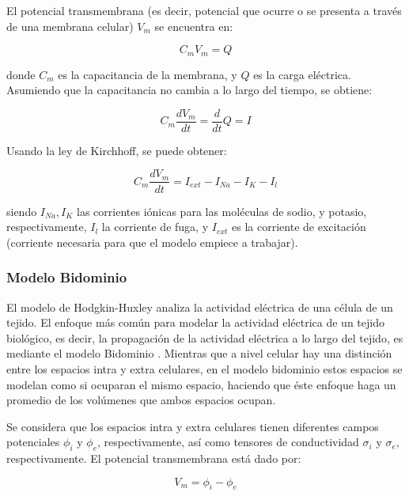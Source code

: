 El potencial transmembrana (es decir, potencial que ocurre o se presenta a través de una membrana celular) $V_m$ se encuentra en:

\begin{equation}
	C_m V_m = Q
\end{equation}

donde $C_m$ es la capacitancia de la membrana, y $Q$ es la carga eléctrica. Asumiendo que la capacitancia no cambia a lo largo del tiempo, se obtiene:

\begin{equation}
	C_m \frac{d V_m}{d t} = \frac{d}{dt} Q = I
\end{equation}

Usando la ley de Kirchhoff, se puede obtener:

\begin{equation}
	C_m \frac{d V_m}{d t} = I_{ext} - I_{Na} - I_K - I_l
\end{equation}

siendo $I_{Na}, I_K$ las corrientes iónicas para las moléculas de sodio, y potasio, respectivamente, $I_l$ la corriente de fuga, y $I_{ext}$ es la corriente de excitación (corriente necesaria para que el modelo empiece a trabajar). 

\subsubsection{Modelo Bidominio}

El modelo de Hodgkin-Huxley analiza la actividad eléctrica de una célula de un tejido. El enfoque más común para modelar la actividad eléctrica de un tejido biológico, es decir, la propagación de la actividad eléctrica a lo largo del tejido, es mediante el modelo Bidominio \citep{physiology2009keener, rohrle2010simulating, matthias20113d}. Mientras que a nivel celular hay una distinción entre los espacios intra y extra celulares, en el modelo bidominio estos espacios se modelan como si ocuparan el mismo espacio, haciendo que éste enfoque haga un promedio de los volúmenes que ambos espacios ocupan.

Se considera que los espacios intra y extra celulares tienen diferentes campos potenciales $\phi_i$ y $\phi_e$, respectivamente, así como tensores de conductividad $\sigma_i$ y $\sigma_e$, respectivamente. El potencial transmembrana está dado por:

\begin{equation}
	V_m = \phi_i - \phi_e
\end{equation}

